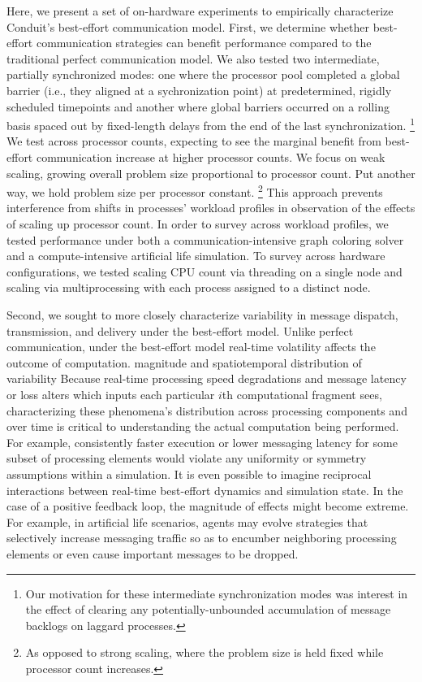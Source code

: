Here, we present a set of on-hardware experiments to empirically characterize Conduit's best-effort communication model.
First, we determine whether best-effort communication strategies can benefit performance compared to the traditional perfect communication model.
We also tested two intermediate, partially synchronized modes: one where the processor pool completed a global barrier (i.e., they aligned at a sychronization point) at predetermined, rigidly scheduled timepoints and another where global barriers occurred on a rolling basis spaced out by fixed-length delays from the end of the last synchronization.%
\footnote{
Our motivation for these intermediate synchronization modes was interest in the effect of clearing any potentially-unbounded accumulation of message backlogs on laggard processes.
}
We test across processor counts, expecting to see the marginal benefit from best-effort communication increase at higher processor counts.
We focus on weak scaling, growing overall problem size proportional to processor count.
Put another way, we hold problem size per processor constant.%
\footnote{
As opposed to strong scaling, where the problem size is held fixed while processor count increases.
}
This approach prevents interference from shifts in processes' workload profiles in observation of the effects of scaling up processor count.
In order to survey across workload profiles, we tested performance under both a communication-intensive graph coloring solver and a compute-intensive artificial life simulation.
To survey across hardware configurations, we tested scaling CPU count via threading on a single node and scaling via multiprocessing with each process assigned to a distinct node.

Second, we sought to more closely characterize variability in message dispatch, transmission, and delivery under the best-effort model.
Unlike perfect communication, under the best-effort model real-time volatility affects the outcome of computation.
magnitude and spatiotemporal distribution of variability
Because real-time processing speed degradations and message latency or loss alters which inputs each particular $i$th computational fragment sees, characterizing these phenomena's distribution across processing components and over time is critical to understanding the actual computation being performed.
For example, consistently faster execution or lower messaging latency for some subset of processing elements would violate any uniformity or symmetry assumptions within a simulation.
It is even possible to imagine reciprocal interactions between real-time best-effort dynamics and simulation state.
In the case of a positive feedback loop, the magnitude of effects might become extreme.
For example, in artificial life scenarios, agents may evolve strategies that selectively increase messaging traffic so as to encumber neighboring processing elements or even cause important messages to be dropped.

